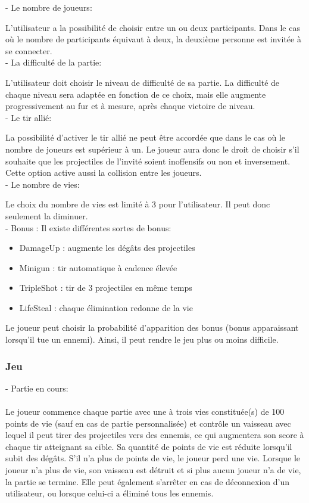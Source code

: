 \documentclass[a4paper,12pt]{article}
\begin{document}
- Le nombre de joueurs: 

L'utilisateur a la possibilité de choisir entre un ou deux participants. Dans le cas où le nombre de participants équivaut à deux, la deuxième personne est invitée à se connecter.\\

- La difficulté de la partie:

 L'utilisateur doit choisir le niveau de difficulté  de sa partie. La difficulté de chaque niveau sera adaptée en fonction de ce choix, mais elle augmente progressivement au fur et à mesure, après chaque victoire de niveau. \\

- Le tir allié: 

La possibilité d'activer le tir allié ne peut être accordée que dans le cas où le nombre de joueurs est supérieur à un.
Le joueur aura donc le droit de choisir s'il souhaite que les projectiles de l'invité soient inoffensifs ou non et inversement. Cette option active aussi la collision entre les joueurs. \\

- Le nombre de vies: 

Le choix du nombre de vies est limité à 3 pour l'utilisateur.  Il peut donc seulement la diminuer.\\

- Bonus :
Il existe différentes sortes de bonus:
\begin{itemize}
  \item DamageUp : augmente les dégâts des projectiles
  \item Minigun : tir automatique à cadence élevée
  \item TripleShot : tir de 3 projectiles en même temps
  \item LifeSteal : chaque élimination redonne de la vie
\end{itemize}

Le joueur peut choisir la probabilité d'apparition des bonus (bonus apparaissant lorsqu'il tue un ennemi).
Ainsi, il peut rendre le jeu plus ou moins difficile. 

\subsubsection{Jeu}

- Partie en cours:\\ \\
Le joueur commence chaque partie avec une à trois vies constituée(s) de 100 points de vie (sauf en cas de partie personnalisée) et
contrôle un vaisseau avec lequel il peut tirer des projectiles vers des ennemis, ce qui 
augmentera son score à chaque tir atteignant sa cible. Sa quantité de points de vie est réduite
lorsqu’il subit des dégâts. S’il n’a plus de points de vie, le joueur perd une vie. Lorsque le 
joueur n’a plus de vie, son vaisseau est détruit et si plus aucun joueur n’a de vie, la partie se 
termine. Elle peut également s’arrêter en cas de déconnexion d’un utilisateur, ou lorsque celui-ci a éliminé tous les ennemis.\\
\end{document}
